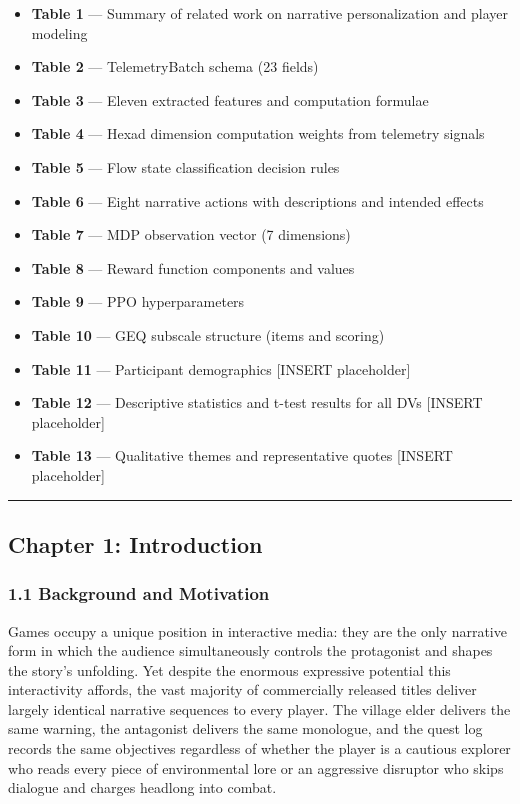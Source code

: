 \begin{itemize}
\tightlist
\item
  \textbf{Table 1} --- Summary of related work on narrative
  personalization and player modeling
\item
  \textbf{Table 2} --- TelemetryBatch schema (23 fields)
\item
  \textbf{Table 3} --- Eleven extracted features and computation
  formulae
\item
  \textbf{Table 4} --- Hexad dimension computation weights from
  telemetry signals
\item
  \textbf{Table 5} --- Flow state classification decision rules
\item
  \textbf{Table 6} --- Eight narrative actions with descriptions and
  intended effects
\item
  \textbf{Table 7} --- MDP observation vector (7 dimensions)
\item
  \textbf{Table 8} --- Reward function components and values
\item
  \textbf{Table 9} --- PPO hyperparameters
\item
  \textbf{Table 10} --- GEQ subscale structure (items and scoring)
\item
  \textbf{Table 11} --- Participant demographics {[}INSERT
  placeholder{]}
\item
  \textbf{Table 12} --- Descriptive statistics and t-test results for
  all DVs {[}INSERT placeholder{]}
\item
  \textbf{Table 13} --- Qualitative themes and representative quotes
  {[}INSERT placeholder{]}
\end{itemize}

\begin{center}\rule{0.5\linewidth}{0.5pt}\end{center}

\subsection{Chapter 1: Introduction}\label{chapter-1-introduction}

\subsubsection{1.1 Background and
Motivation}\label{background-and-motivation}

Games occupy a unique position in interactive media: they are the only
narrative form in which the audience simultaneously controls the
protagonist and shapes the story's unfolding. Yet despite the enormous
expressive potential this interactivity affords, the vast majority of
commercially released titles deliver largely identical narrative
sequences to every player. The village elder delivers the same warning,
the antagonist delivers the same monologue, and the quest log records
the same objectives regardless of whether the player is a cautious
explorer who reads every piece of environmental lore or an aggressive
disruptor who skips dialogue and charges headlong into combat.

